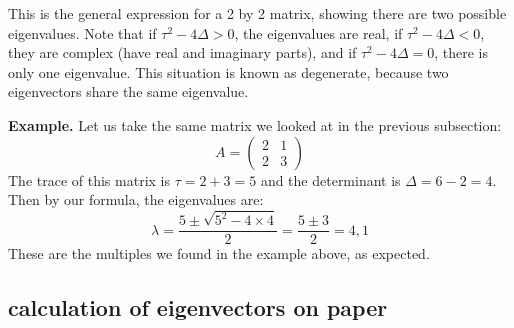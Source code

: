 \documentclass[
]{book}
\theoremstyle{definition}
\theoremstyle{definition}
\theoremstyle{definition}
\theoremstyle{remark}
\begin{document}
This is the general expression for a 2 by 2 matrix, showing there are two possible eigenvalues. Note that if \(\tau^2-4\Delta>0\), the eigenvalues are real, if \(\tau^2-4\Delta<0\), they are complex (have real and imaginary parts), and if \(\tau^2-4\Delta=0\), there is only one eigenvalue. This situation is known as degenerate, because two eigenvectors share the same eigenvalue.

\textbf{Example.} Let us take the same matrix we looked at in the previous subsection:
\[ A = \left(\begin{array}{cc}2 & 1 \\ 2& 3\end{array}\right)\]
The trace of this matrix is \(\tau = 2+3 =5\) and the determinant is \(\Delta = 6 - 2 = 4\). Then by our formula, the eigenvalues are:
\[\lambda = \frac{5 \pm \sqrt{5^2-4 \times 4}}{2}  =  \frac{5 \pm 3}{2}  = 4, 1\]
These are the multiples we found in the example above, as expected.

\hypertarget{calculation-of-eigenvectors-on-paper}{%
\subsection{calculation of eigenvectors on paper}\label{calculation-of-eigenvectors-on-paper}}
\end{document}
